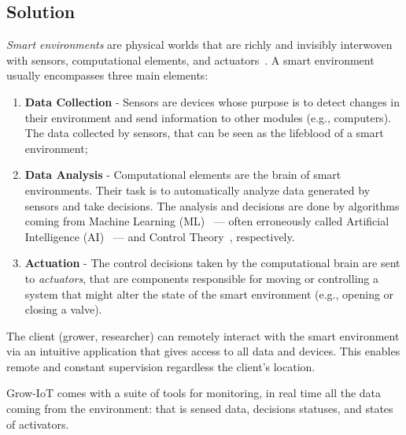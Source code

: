 

\subsection{Solution}\label{sec:solution}

\emph{Smart environments} are physical worlds
that are richly and invisibly interwoven with sensors, computational elements, and actuators~\cite{weiser1999origins}.
A smart environment usually encompasses three main elements:

\begin{enumerate}
    \item {\bf Data Collection} - Sensors are devices whose purpose is to detect changes
    in their environment and send information to other
    modules (e.g., computers). The data collected by sensors, that can be seen as the lifeblood of a smart environment;
    
    \item {\bf Data Analysis} - Computational elements are the brain of smart environments. Their task is to automatically analyze data generated by sensors and take decisions.
    The analysis and decisions are done
    by algorithms coming from Machine Learning (ML)~\cite{nasrabadi2007pattern, andrieu2003introduction} --- often erroneously called Artificial Intelligence (AI)~\cite{AIvsML} --- and Control Theory~\cite{lee1967foundations, boyd1994linear}, respectively.
    
    \item {\bf Actuation} - The control decisions taken by the computational brain are sent to \emph{actuators}, that are components responsible for moving or controlling a system that might alter the state of the smart environment (e.g., opening or closing a valve).
\end{enumerate}

The client (grower, researcher) can remotely interact with the smart environment via an intuitive
application that gives access to all data and devices.
This enables remote and constant supervision regardless 
the client's location.

Grow-IoT comes with a suite of tools for monitoring, in real time
all the data coming from the environment: that is sensed data,
decisions statuses, and states of activators.\cite{CommonGarden}



